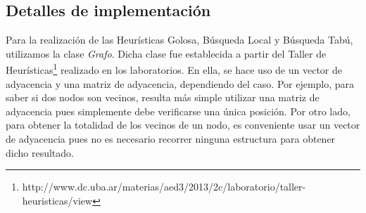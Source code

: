 \documentclass[10pt, a4paper]{article}
\begin{document}
\begin{itemize}
\section{Detalles de implementación}
Para la realización de las Heurísticas Golosa, Búsqueda Local y Búsqueda Tabú, utilizamos la clase \textit{Grafo}. Dicha clase fue establecida a partir del Taller de Heurísticas\footnote{http://www.dc.uba.ar/materias/aed3/2013/2c/laboratorio/taller-heuristicas/view} realizado en los laboratorios. En ella, se hace uso de un vector de adyacencia y una matriz de adyacencia, dependiendo del caso. Por ejemplo, para saber si dos nodos son vecinos, resulta más simple utilizar una matriz de adyacencia pues simplemente debe verificarse una única posición. Por otro lado, para obtener la totalidad de los vecinos de un nodo, es conveniente usar un vector de adyacencia pues no es necesario recorrer ninguna estructura para obtener dicho resultado. 


\end{itemize}
\end{document}
